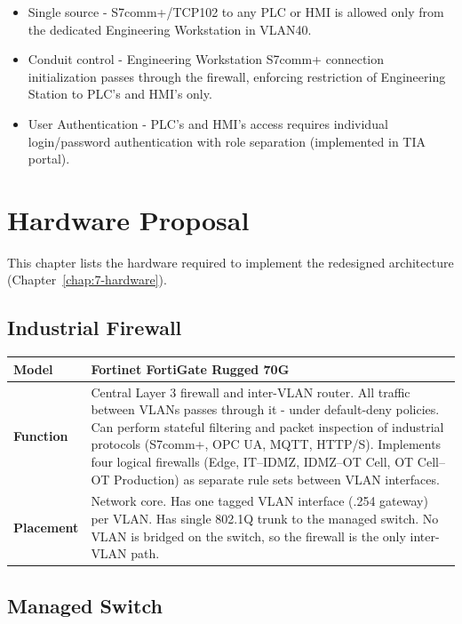 \documentclass{report}
\begin{document}
\begin{itemize}
    \item Single source - S7comm+/TCP102 to any PLC or HMI is allowed only from the dedicated Engineering Workstation in VLAN40.
    \item Conduit control - Engineering Workstation S7comm+ connection initialization passes through the firewall, enforcing restriction of Engineering Station to PLC's and HMI's only.
    \item User Authentication - PLC's and HMI's access requires individual login/password authentication with role separation (implemented in TIA
        portal).
\end{itemize}

\section{Hardware Proposal}
This chapter lists the hardware required to implement the redesigned architecture (Chapter~\ref{chap:7-hardware}). 

\subsection{Industrial Firewall}

\renewcommand{\arraystretch}{1.3} %
\begin{tabularx}{\textwidth}{>{\bfseries}p{2.5cm} X}
    \toprule
    Model & Fortinet FortiGate Rugged 70G \\
    \midrule
    Function & Central Layer 3 firewall and inter-VLAN router. All traffic
    between VLANs passes through it - under default-deny policies. Can perform
    stateful filtering and packet inspection of industrial protocols (S7comm+,
    OPC UA, MQTT, HTTP/S). Implements four logical firewalls (Edge, IT–IDMZ,
    IDMZ–OT Cell, OT Cell–OT Production) as separate rule sets between VLAN
    interfaces. \\
    \midrule
    Placement & Network core. Has one tagged VLAN interface (.254 gateway) per
    VLAN. Has single 802.1Q trunk to the managed switch. No VLAN is bridged on
    the switch, so the firewall is the only inter-VLAN path. \\
    \midrule
\end{tabularx}

\subsection{Managed Switch}
\end{document}
